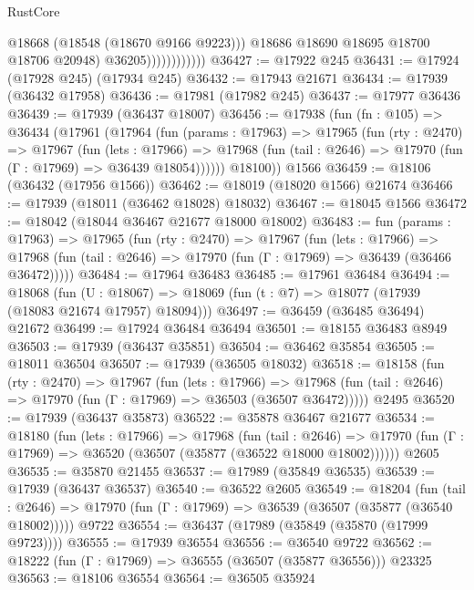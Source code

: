 \begin{lexlean}{RustCore}
\begin{coremodule}
                                @18668
                                (@18548 (@18670 @9166 @9223)))
                              @18686
                              @18690
                              @18695
                              @18700
                              @18706
                              @20948)
                            @36205))))))))))))
@36427 := @17922 @245
@36431 := @17924 (@17928 @245) (@17934 @245)
@36432 := @17943 @21671
@36434 := @17939 (@36432 @17958)
@36436 := @17981 (@17982 @245)
@36437 := @17977 @36436
@36439 := @17939 (@36437 @18007)
@36456 := @17938
    (fun (fn : @105) =>
    @36434
      (@17961
        (@17964
          (fun (params : @17963) =>
          @17965
            (fun (rty : @2470) =>
            @17967
              (fun (lets : @17966) =>
              @17968 (fun (tail : @2646) => @17970 (fun (Γ : @17969) => @36439 @18054))))))
        @18100))
    @1566
@36459 := @18106 (@36432 (@17956 @1566))
@36462 := @18019 (@18020 @1566) @21674
@36466 := @17939 (@18011 (@36462 @18028) @18032)
@36467 := @18045 @1566
@36472 := @18042 (@18044 @36467 @21677 @18000 @18002)
@36483 := fun (params : @17963) =>
  @17965
    (fun (rty : @2470) =>
    @17967
      (fun (lets : @17966) =>
      @17968 (fun (tail : @2646) => @17970 (fun (Γ : @17969) => @36439 (@36466 @36472)))))
@36484 := @17964 @36483
@36485 := @17961 @36484
@36494 := @18068
    (fun (U : @18067) => @18069 (fun (t : @7) => @18077 (@17939 (@18083 @21674 @17957) @18094)))
@36497 := @36459 (@36485 @36494) @21672
@36499 := @17924 @36484 @36494
@36501 := @18155 @36483 @8949
@36503 := @17939 (@36437 @35851)
@36504 := @36462 @35854
@36505 := @18011 @36504
@36507 := @17939 (@36505 @18032)
@36518 := @18158
    (fun (rty : @2470) =>
    @17967
      (fun (lets : @17966) =>
      @17968 (fun (tail : @2646) => @17970 (fun (Γ : @17969) => @36503 (@36507 @36472)))))
    @2495
@36520 := @17939 (@36437 @35873)
@36522 := @35878 @36467 @21677
@36534 := @18180
    (fun (lets : @17966) =>
    @17968
      (fun (tail : @2646) =>
      @17970 (fun (Γ : @17969) => @36520 (@36507 (@35877 (@36522 @18000 @18002))))))
    @2605
@36535 := @35870 @21455
@36537 := @17989 (@35849 @36535)
@36539 := @17939 (@36437 @36537)
@36540 := @36522 @2605
@36549 := @18204
    (fun (tail : @2646) => @17970 (fun (Γ : @17969) => @36539 (@36507 (@35877 (@36540 @18002)))))
    @9722
@36554 := @36437 (@17989 (@35849 (@35870 (@17999 @9723))))
@36555 := @17939 @36554
@36556 := @36540 @9722
@36562 := @18222 (fun (Γ : @17969) => @36555 (@36507 (@35877 @36556))) @23325
@36563 := @18106 @36554
@36564 := @36505 @35924

\end{coremodule}
\end{lexlean}

